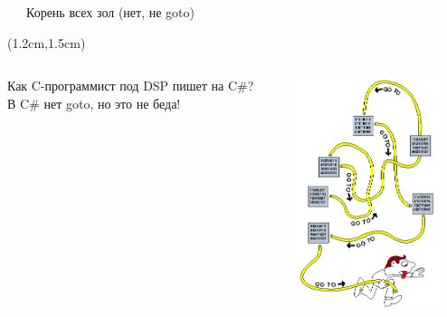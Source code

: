 \documentclass[xetex,18pt,aspectratio=43]{beamer}
\begin{document}
\begin{Large}
\begin{frame}{\ \ \ Корень всех зол (нет, не goto)}
\begin{textblock*}{\framewidth-0.5cm}(1.2cm,1.5cm) %
  \begin{columns}[onlytextwidth,t]
    \begin{column}{0.5\textwidth}
      Как C-программист под DSP пишет на C{\lserif\#}?\\
      {\small В C{\lserif\#} нет goto, но это не беда!}
    \end{column}
    \begin{column}{0.5\textwidth}
      \centering
      \includegraphics[height=6.8cm,valign=t]{img/spaghetti.png}
    \end{column}
  \end{columns}
\end{textblock*}
\end{frame}





\end{Large}
\end{document}
